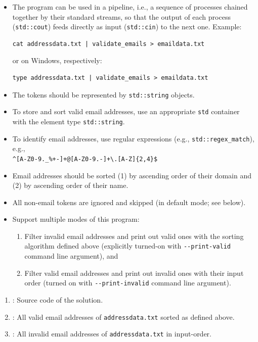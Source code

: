 \documentclass{cgsblatt}
\begin{document}
\begin{itemize}
\setlength{\parskip}{4pt}
\item The program can be used in a pipeline, 
i.e., a sequence of processes chained together by their standard streams, 
so that the output of each process (\lstinline|std::cout|) 
feeds directly as input (\lstinline|std::cin|) to the next one. Example: \\

\begin{lstlisting}[style=Bash]
cat addressdata.txt | validate_emails > emaildata.txt
\end{lstlisting}\medskip

or on Windows, respectively:

\begin{lstlisting}[style=Bash]
type addressdata.txt | validate_emails > emaildata.txt
\end{lstlisting}\medskip

\item The tokens should be represented by \texttt{std::string} objects.
\item To store and sort valid email addresses, 
use an appropriate \texttt{std} container with the element type \lstinline|std::string|.
\item To identify email addresses, 
use regular expressions (e.g., \lstinline{std::regex_match}), e.g., \\
\lstinline|^[A-Z0-9._%+-]+@[A-Z0-9.-]+\.[A-Z]{2,4}$|
\item Email addresses should be sorted 
(1) by ascending order of their domain 
and (2) by ascending order of their name.
\item All non-email tokens are ignored and skipped (in default mode; see below). 
\item Support multiple modes of this program:
\begin{enumerate}
	\item Filter invalid email addresses and print out valid ones with the sorting algorithm defined above (explicitly turned-on with \lstinline{--print-valid} command line argument), and
	\item Filter valid email addresses and print out invalid ones with their input order (turned on with \lstinline{--print-invalid} command line argument).
\end{enumerate}
\end{itemize}

\begin{enumerate}
	\item {} : Source code of the solution.
	\item {} : All valid email addresses of \lstinline|addressdata.txt| sorted as defined above.
	\item {} : All invalid email addresses of \lstinline|addressdata.txt| in input-order.
\end{enumerate}
\end{document}
